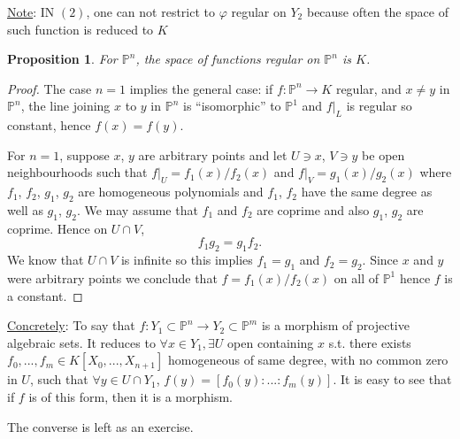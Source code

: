 \documentclass[11pt]{article}
\newtheorem{prop}[thm]{Proposition}
\newcommand{\proj}{\mathbb P}
\newcommand{\lrta}{\longrightarrow}
\begin{document}
\underline{Note}: IN $(2)$, one can not restrict to $\varphi$ regular on $Y_2$ because often the space of such function is reduced to $K$
\begin{prop}
For $\proj^n$, the space of functions regular on $\proj^n$ is $K$.
\end{prop}
\begin{proof}
The case $n=1$ implies the general case: if $f:\proj^n\lrta K$ regular, and $x\neq y$ in $\proj^n$, the line joining $x$ to $y$ in $\proj^n$ is ``isomorphic'' to $\proj^1$ and $f|_L$ is regular so constant, hence $f(x)=f(y)$.

For $n=1$, suppose $x$, $y$ are arbitrary points and let $U \ni x$, $V\ni y$ be open neighbourhoods such that $f|_U =f_1(x)/f_2(x)$ and $f|_V = g_1(x)/g_2(x)$ where $f_1$, $f_2$, $g_1$, $g_2$ are homogeneous polynomials and $f_1$, $f_2$ have the same degree as well as $g_1$, $g_2$. We may assume that $f_1$ and $f_2$ are coprime and also $g_1$, $g_2$ are coprime. Hence on $U \cap V$,
$$
f_1 g_2 = g_1 f_2.
$$
We know that $U \cap V$ is infinite so this implies $f_1 = g_1$ and $ f_2 = g_2$. Since $x$ and $y$ were arbitrary points we conclude that $f = f_1(x)/f_2(x)$ on all of $\proj^1$ hence $f$ is a constant.
\end{proof}
\underline{Concretely}: To say that $f: Y_1\subset \proj^n\lrta Y_2\subset \proj^m$  is a morphism of projective algebraic sets. It reduces to 
$\forall x\in Y_1,\exists U$ open containing $x$ s.t. there exists $f_0,...,f_m\in K[X_0,...,X_{n+1}]$
homogeneous of same degree, with no common zero in $U$, such that
$\forall y\in U\cap Y_1$, $f(y)=[f_0(y):...:f_m(y)]$. It is easy to see that if $f$ is of this form, then it is a morphism.

The converse is left as an exercise.
\end{document}
